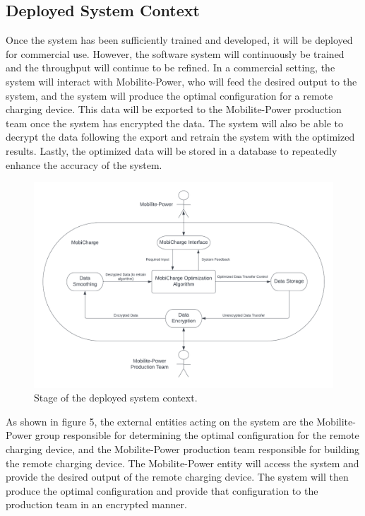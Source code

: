 \documentclass[12pt, titlepage]{article}
\begin{document}
\subsection{Deployed System Context}
Once the system has been sufficiently trained and developed, it will be deployed for commercial use. However, the software system will continuously be trained and the throughput will continue to be refined. In a commercial setting, the system will interact with Mobilite-Power, who will feed the desired output to the system, and the system will produce the optimal configuration for a remote charging device. This data will be exported to the Mobilite-Power production team once the system has encrypted the data. The system will also be able to decrypt the data following the export and retrain the system with the optimized results. Lastly, the optimized data will be stored in a database to repeatedly enhance the accuracy of the system.
\newpage
\begin{figure}[h]
    \centering
    \includegraphics[width=15cm]{images/context3.png}
    \caption[Deployed System Contexts 1]{Stage of the deployed system context.}
    \label{fig:figure5}
\end{figure}
As shown in figure 5, the external entities acting on the system are the Mobilite-Power group responsible for determining the optimal configuration for the remote charging device, and the Mobilite-Power production team responsible for building the remote charging device. The Mobilite-Power entity will access the system and provide the desired output of the remote charging device. The system will then produce the optimal configuration and provide that configuration to the production team in an encrypted manner. 
\end{document}
